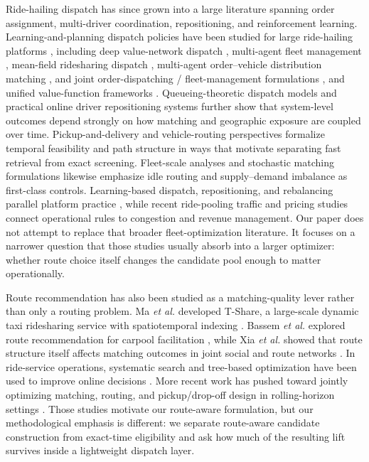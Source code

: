 \documentclass[journal]{IEEEtran}
\begin{document}
Ride-hailing dispatch has since grown into a large literature spanning order assignment, multi-driver coordination, repositioning, and reinforcement learning. Learning-and-planning dispatch policies have been studied for large ride-hailing platforms \cite{xu2018dispatch}, including deep value-network dispatch \cite{tang2019deepvalue}, multi-agent fleet management \cite{lin2018fleet}, mean-field ridesharing dispatch \cite{li2019meanfield}, multi-agent order--vehicle distribution matching \cite{zhou2019ovdm}, and joint order-dispatching / fleet-management formulations \cite{jin2019coride}, and unified value-function frameworks \cite{tang2021value}. Queueing-theoretic dispatch models \cite{cheng2019queueing} and practical online driver repositioning systems \cite{xu2020reposition} further show that system-level outcomes depend strongly on how matching and geographic exposure are coupled over time. Pickup-and-delivery and vehicle-routing perspectives \cite{berbeglia2010dynamic,pillac2013dynamic,psaraftis1995dynamic,solomon1987vrptw,laporte2009fifty,toth2002vrp,savelsbergh1995general,cordeau2007dialaride} formalize temporal feasibility and path structure in ways that motivate separating fast retrieval from exact screening. Fleet-scale analyses \cite{vazifeh2018fleet,braverman2019empty} and stochastic matching formulations \cite{bertsimas2019online,ozkan2020dynamic} likewise emphasize idle routing and supply--demand imbalance as first-class controls. Learning-based dispatch, repositioning, and rebalancing \cite{wang2020knowledge,ding2020rebalancing,wei2024repositioning,mao2020avdispatch,wallar2019routing,lei2023rlpricing,liu2022personalizedroute} parallel platform practice \cite{xu2020reposition}, while recent ride-pooling traffic and pricing studies \cite{ke2020ridepooling,karaenke2023expool} connect operational rules to congestion and revenue management. Our paper does not attempt to replace that broader fleet-optimization literature. It focuses on a narrower question that those studies usually absorb into a larger optimizer: whether route choice itself changes the candidate pool enough to matter operationally.

Route recommendation has also been studied as a matching-quality lever rather than only a routing problem. Ma \emph{et al.} developed T-Share, a large-scale dynamic taxi ridesharing service with spatiotemporal indexing \cite{ma2013tshare}. Bassem \emph{et al.} explored route recommendation for carpool facilitation \cite{bassem2022}, while Xia \emph{et al.} showed that route structure itself affects matching outcomes in joint social and route networks \cite{xia2019}. In ride-service operations, systematic search and tree-based optimization have been used to improve online decisions \cite{chen2021}. More recent work has pushed toward jointly optimizing matching, routing, and pickup/drop-off design in rolling-horizon settings \cite{stumpe2024,zhou2026}. Those studies motivate our route-aware formulation, but our methodological emphasis is different: we separate route-aware candidate construction from exact-time eligibility and ask how much of the resulting lift survives inside a lightweight dispatch layer.
\end{document}
